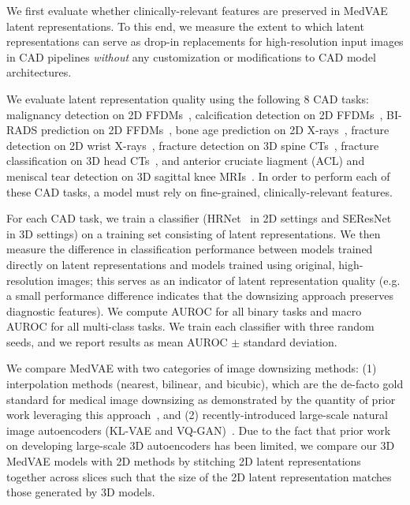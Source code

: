 We first evaluate whether clinically-relevant features are preserved in MedVAE latent representations. To this end, we measure the extent to which latent representations can serve as drop-in replacements for high-resolution input images in CAD pipelines \textit{without} any customization or modifications to CAD model architectures. 

We evaluate latent representation quality using the following 8 CAD tasks: malignancy detection on 2D FFDMs~\cite{cai2023online}, calcification detection on 2D FFDMs~\cite{cai2023online}, BI-RADS prediction on 2D FFDMs~\cite{nguyen2022vindrmammo}, bone age prediction on 2D X-rays~\cite{rsnaboneage}, fracture detection on 2D wrist X-rays~\cite{Nagy2022wristfrac}, fracture detection on 3D spine CTs~\cite{loffler2020vertebral}, fracture classification on 3D head CTs~\cite{chilamkurthy2018development}, and anterior cruciate liagment (ACL) and meniscal tear detection on 3D sagittal knee MRIs~\cite{bien2018deep}. In order to perform each of these CAD tasks, a model must rely on fine-grained, clinically-relevant features.%

For each CAD task, we train a classifier (HRNet~\cite{wang2020hrnet} in 2D settings and SEResNet~\cite{hu2018squeeze} in 3D settings) on a training set consisting of latent representations. We then measure the difference in classification performance between models trained directly on latent representations and models trained using original, high-resolution images; this serves as an indicator of latent representation quality (e.g. a small performance difference indicates that the downsizing approach preserves diagnostic features). We compute AUROC for all binary tasks and macro AUROC for all multi-class tasks. We train each classifier with three random seeds, and we report results as mean AUROC $\pm$ standard deviation.

We compare MedVAE with two categories of image downsizing methods: (1) interpolation methods (nearest, bilinear, and bicubic), which are the de-facto gold standard for medical image downsizing as demonstrated by the quantity of prior work leveraging this approach~\cite{wantlin2023benchmd, Varma2019, convirt, Huang_2021_ICCV, miura2021improving, Tiu2022}, and (2) recently-introduced large-scale natural image autoencoders (KL-VAE and VQ-GAN)~\cite{rombach2022high}. Due to the fact that prior work on developing large-scale 3D autoencoders has been limited, we compare our 3D MedVAE models with 2D methods by stitching 2D latent representations together across slices such that the size of the 2D latent representation matches those generated by 3D models. 

